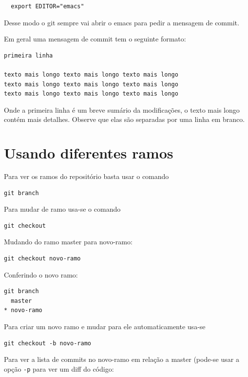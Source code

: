 \documentclass[12pt,brazil]{book}
\begin{document}
\begin{verbatim}
  export EDITOR="emacs"
\end{verbatim}

Desse modo o git sempre vai abrir o emacs para pedir a mensagem de
commit.

Em geral uma mensagem de commit tem o seguinte formato:

\begin{verbatim}
primeira linha

texto mais longo texto mais longo texto mais longo
texto mais longo texto mais longo texto mais longo
texto mais longo texto mais longo texto mais longo 
\end{verbatim}

Onde a primeira linha é um breve sumário da modificações, o texto mais
longo contém mais detalhes. Observe que elas são separadas por uma
linha em branco.

\section{Usando diferentes ramos}
\label{sec:usando-o-git}

Para ver os ramos do repositório basta usar o comando

\begin{verbatim}
git branch
\end{verbatim}

Para mudar de ramo usa-se o comando

\begin{verbatim}
git checkout
\end{verbatim}

Mudando do ramo master para novo-ramo:

\begin{verbatim}
git checkout novo-ramo
\end{verbatim}

Conferindo o novo ramo:

\begin{verbatim}
git branch
  master
* novo-ramo
\end{verbatim}

Para criar um novo ramo e mudar para ele automaticamente usa-se

\begin{verbatim}
git checkout -b novo-ramo
\end{verbatim}

Para ver a lista de commits no novo-ramo em relação a master (pode-se
usar a opção \texttt{-p} para ver um diff do código:
\end{document}
